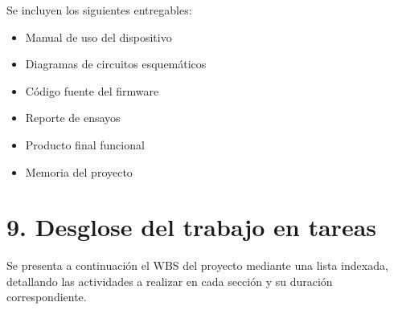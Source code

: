 \documentclass[
11pt, %
]{charter}
\begin{document}
Se incluyen los siguientes entregables:

\begin{itemize}
	\item Manual de uso del dispositivo
	\item Diagramas de circuitos esquemáticos
	\item Código fuente del firmware
	\item Reporte de ensayos
	\item Producto final funcional
	\item Memoria del proyecto
\end{itemize}

\section{9. Desglose del trabajo en tareas}
\label{sec:wbs}

Se presenta a continuación el WBS del proyecto mediante una lista indexada, detallando las actividades a realizar en cada sección y su duración correspondiente.
\end{document}
